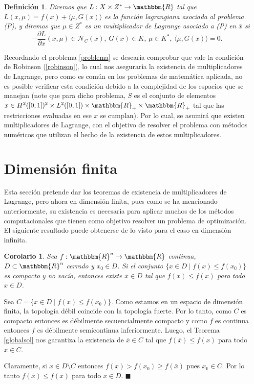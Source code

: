 \documentclass[a4paper,10pt]{book}
\newcommand{\R}{\mathbbm{R}}
\newcommand{\arr}{\rightarrow}
\newcommand{\bx}{\bar{x}}
\newcommand{\cN}{\mathcal{N}}
\newtheorem{cor}[teo]{Corolario}
\newtheorem{defi}[teo]{Definici\'on}
\newenvironment{dem}{\vspace*{-0.1cm}{\it Demostraci\'on:}}{\hfill
$\blacksquare$\\}
\begin{document}
\begin{defi}\label{lagrangiana}
 Diremos que $L:X\times Z^*\arr \R$ tal que $L(x,\mu)= f(x)+\langle\mu , G(x)\rangle$ es la función lagrangiana asociada al problema (P), y diremos que $\mu\in Z^*$ es un multiplicador de Lagrange asociado a (P) en $\bx$ si 
 $$-\frac{\partial L}{\partial x}(\bx,\mu)\in\cN_C(\bx),\ G(\bx)\in K,\ \mu\in K^* ,\  \langle\mu , G(\bx)\rangle=0.$$ 
\end{defi}

Recordando el problema \eqref{problema} se desearía comprobar que vale la condición de Robinson (\ref{robinson}), lo cual nos aseguraría la existencia de multiplicadores de Lagrange, pero como es común en los problemas de matemática aplicada, no es posible verificar esta condición debido a la complejidad de los espacios que se manejan (note que para dicho problema, $S$ es el conjunto de elementos $x\in H^2([0,1])^2 \times L^2([0,1])\times \R_+\times \R_+$ tal que las restricciones evaluadas en ese $x$ se cumplan). Por lo cual, se asumirá que existen multiplicadores de Lagrange, con el objetivo de resolver el problema con métodos numéricos que utilizan el hecho de la existencia de estos multiplicadores.

\section{Dimensión finita}\label{dimensionfinita}

Esta sección pretende dar los teoremas de existencia de multiplicadores de Lagrange, pero ahora en dimensión finita, pues como se ha mencionado anteriormente, su existencia es necesaria para aplicar muchos de los métodos computacionales que tienen como objetivo resolver un problema de optimización. El siguiente resultado puede obtenerse de lo visto para el caso en dimensión infinita.

\begin{cor}\label{solglobalfinita}
 Sea $f:\R^n\to\R$ continua, $D\subset\R^n$ cerrado y $x_0\in D$. Si el conjunto $\{x\in D \mid f(x)\leq f(x_0)\}$ es compacto y no vacío, entonces existe $\bar{x}\in D$ tal que $f(\bar{x})\leq f(x)$ para todo $x\in D$.
\end{cor}
\begin{dem}
 Sea $C=\{x\in D \mid f(x)\leq f(x_0)\}$. Como estamos en un espacio de dimensión finita, la topología débil coincide con la topología fuerte. Por lo tanto, como $C$ es compacto entonces es débilmente secuencialmente compacto y como $f$ es continua entonces $f$ es débilmente semicontinua inferiormente. Luego, el Teorema \ref{globalsol} nos garantiza la existencia de $\bx\in C$ tal que $f(\bx)\leq f(x)$ para todo $x\in C$.
 
 Claramente, si $x\in D\setminus C$ entonces $f(x)>f(x_0)\geq f(\bx)$ pues $x_0\in C$. Por lo tanto $f(\bx)\leq f(x)$ para todo $x\in D$.
\end{dem}
\end{document}
